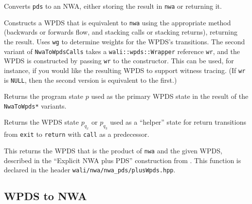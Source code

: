 \begin{functionlist}
    Converts \texttt{pds} to an NWA, either storing the result in
    \texttt{nwa} or returning it.

    Constructs a WPDS that is equivalent to \texttt{nwa} using the
    appropriate method (backwards or forwards flow, and stacking calls or
    stacking returns), returning the result. Uses \texttt{wg} to determine
    weights for the WPDS's transitions. The second variant of
    \texttt{NwaToWpdsCalls} takes a \texttt{wali::wpds::Wrapper} reference
    \texttt{wr}, and the WPDS is constructed by passing \texttt{wr} to the
    constructor. This can be used, for instance, if you would like the
    resulting WPDS to support witness tracing. (If \texttt{wr} is
    \texttt{NULL}, then the second version is equivalent to the first.)

    Returns the program state $p$ used as the primary WPDS state in the
    result of the \texttt{NwaToWpds*} variants.

    Returns the WPDS state $p_{q_x}$ or $p_{q_3}$ used as a ``helper'' state
    for return transitions from \texttt{exit} to \texttt{return} with
    \texttt{call} as a predecessor.

    This returns the WPDS that is the
    product of \texttt{nwa} and the given WPDS, described in the ``Explicit
    NWA plus PDS'' construction from \cite[\S6]{advancedquerying}. This
    function is declared in the header
    \texttt{wali/nwa/nwa\_pds/plusWpds.hpp}.
\end{functionlist}


\subsection{WPDS to NWA}
\label{Se:WpdsToNwa}

